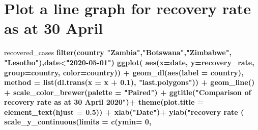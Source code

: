 \documentclass[
]{article}
\newenvironment{Shaded}{\begin{snugshade}}{\end{snugshade}}
\newcommand{\DataTypeTok}[1]{\textcolor[rgb]{0.13,0.29,0.53}{#1}}
\newcommand{\DecValTok}[1]{\textcolor[rgb]{0.00,0.00,0.81}{#1}}
\newcommand{\FloatTok}[1]{\textcolor[rgb]{0.00,0.00,0.81}{#1}}
\newcommand{\KeywordTok}[1]{\textcolor[rgb]{0.13,0.29,0.53}{\textbf{#1}}}
\newcommand{\NormalTok}[1]{#1}
\newcommand{\OperatorTok}[1]{\textcolor[rgb]{0.81,0.36,0.00}{\textbf{#1}}}
\newcommand{\StringTok}[1]{\textcolor[rgb]{0.31,0.60,0.02}{#1}}
\begin{document}
\hypertarget{plot-a-line-graph-for-recovery-rate-as-at-30-april}{%
\section{Plot a line graph for recovery rate as at 30
April}\label{plot-a-line-graph-for-recovery-rate-as-at-30-april}}

\begin{Shaded}
\begin{Highlighting}[]
\NormalTok{recovered_cases }\OperatorTok{%>%}
\StringTok{  }\KeywordTok{filter}\NormalTok{(country }\OperatorTok{%in%}\StringTok{ }\KeywordTok{c}\NormalTok{(}\StringTok{"Eswatini"}\NormalTok{,}\StringTok{"Mozambique"}\NormalTok{,}\StringTok{"Angola"}\NormalTok{,}\StringTok{"Malawi"}\NormalTok{,}\StringTok{"Namibia"}\NormalTok{,}\StringTok{"South Africa"}\NormalTok{,}
                        \StringTok{"Zambia"}\NormalTok{,}\StringTok{"Botswana"}\NormalTok{,}\StringTok{"Zimbabwe"}\NormalTok{, }\StringTok{"Lesotho"}\NormalTok{),date}\OperatorTok{<}\StringTok{"2020-05-01"}\NormalTok{) }\OperatorTok{%>%}\StringTok{ }
\StringTok{   }\KeywordTok{ggplot}\NormalTok{( }\KeywordTok{aes}\NormalTok{(}\DataTypeTok{x=}\NormalTok{date, }\DataTypeTok{y=}\NormalTok{recovery_rate, }\DataTypeTok{group=}\NormalTok{country, }\DataTypeTok{color=}\NormalTok{country)) }\OperatorTok{+}
\StringTok{  }\KeywordTok{geom_dl}\NormalTok{(}\KeywordTok{aes}\NormalTok{(}\DataTypeTok{label =}\NormalTok{ country), }
          \DataTypeTok{method =} \KeywordTok{list}\NormalTok{(}\KeywordTok{dl.trans}\NormalTok{(}\DataTypeTok{x =}\NormalTok{ x }\OperatorTok{+}\StringTok{ }\FloatTok{0.1}\NormalTok{), }\StringTok{"last.polygons"}\NormalTok{)) }\OperatorTok{+}
\StringTok{  }\KeywordTok{geom_line}\NormalTok{() }\OperatorTok{+}
\StringTok{  }\KeywordTok{scale_color_brewer}\NormalTok{(}\DataTypeTok{palette =} \StringTok{"Paired"}\NormalTok{) }\OperatorTok{+}
\StringTok{   }\KeywordTok{ggtitle}\NormalTok{(}\StringTok{"Comparison of recovery rate as at 30 April 2020"}\NormalTok{)}\OperatorTok{+}
\StringTok{  }\KeywordTok{theme}\NormalTok{(}\DataTypeTok{plot.title =} \KeywordTok{element_text}\NormalTok{(}\DataTypeTok{hjust =} \FloatTok{0.5}\NormalTok{)) }\OperatorTok{+}
\StringTok{   }\KeywordTok{xlab}\NormalTok{(}\StringTok{"Date"}\NormalTok{)}\OperatorTok{+}
\StringTok{  }\KeywordTok{ylab}\NormalTok{(}\StringTok{"recovery rate (% of confirmed cases"}\NormalTok{) }\OperatorTok{+}
\StringTok{  }\KeywordTok{scale_y_continuous}\NormalTok{(}\DataTypeTok{limits =} \KeywordTok{c}\NormalTok{(}\DataTypeTok{ymin=} \DecValTok{0}\NormalTok{, }
}}}}
\end{Highlighting}
\end{Shaded}
\end{document}
